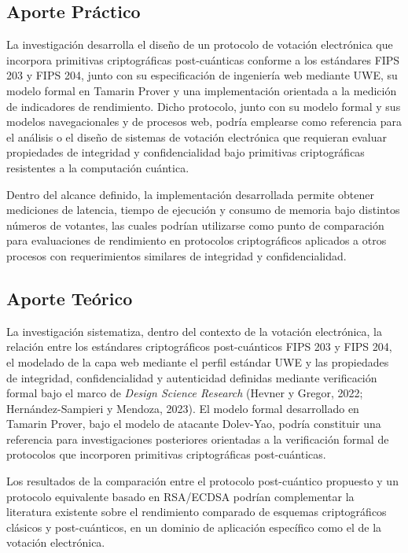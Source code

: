 \subsection{Aporte Práctico}
La investigación desarrolla el diseño de un protocolo de votación electrónica que incorpora primitivas criptográficas post-cuánticas conforme a los estándares FIPS 203 y FIPS 204, junto con su especificación de ingeniería web mediante UWE, su modelo formal en Tamarin Prover y una implementación orientada a la medición de indicadores de rendimiento. Dicho protocolo, junto con su modelo formal y sus modelos navegacionales y de procesos web, podría emplearse como referencia para el análisis o el diseño de sistemas de votación electrónica que requieran evaluar propiedades de integridad y confidencialidad bajo primitivas criptográficas resistentes a la computación cuántica.

Dentro del alcance definido, la implementación desarrollada permite obtener mediciones de latencia, tiempo de ejecución y consumo de memoria bajo distintos números de votantes, las cuales podrían utilizarse como punto de comparación para evaluaciones de rendimiento en protocolos criptográficos aplicados a otros procesos con requerimientos similares de integridad y confidencialidad.

\subsection{Aporte Teórico}
La investigación sistematiza, dentro del contexto de la votación electrónica, la relación entre los estándares criptográficos post-cuánticos FIPS 203 y FIPS 204, el modelado de la capa web mediante el perfil estándar UWE y las propiedades de integridad, confidencialidad y autenticidad definidas mediante verificación formal bajo el marco de \textit{Design Science Research} (Hevner y Gregor, 2022; Hernández-Sampieri y Mendoza, 2023). El modelo formal desarrollado en Tamarin Prover, bajo el modelo de atacante Dolev-Yao, podría constituir una referencia para investigaciones posteriores orientadas a la verificación formal de protocolos que incorporen primitivas criptográficas post-cuánticas.

Los resultados de la comparación entre el protocolo post-cuántico propuesto y un protocolo equivalente basado en RSA/ECDSA podrían complementar la literatura existente sobre el rendimiento comparado de esquemas criptográficos clásicos y post-cuánticos, en un dominio de aplicación específico como el de la votación electrónica.
